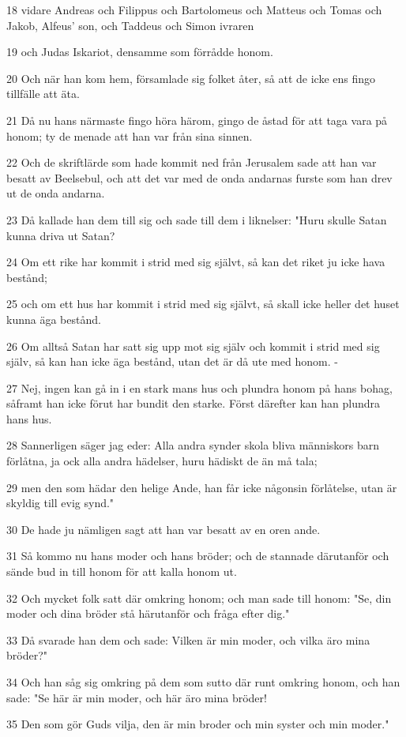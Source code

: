 \par 18 vidare Andreas och Filippus och Bartolomeus och Matteus och Tomas och Jakob, Alfeus' son, och Taddeus och Simon ivraren
\par 19 och Judas Iskariot, densamme som förrådde honom.
\par 20 Och när han kom hem, församlade sig folket åter, så att de icke ens fingo tillfälle att äta.
\par 21 Då nu hans närmaste fingo höra härom, gingo de åstad för att taga vara på honom; ty de menade att han var från sina sinnen.
\par 22 Och de skriftlärde som hade kommit ned från Jerusalem sade att han var besatt av Beelsebul, och att det var med de onda andarnas furste som han drev ut de onda andarna.
\par 23 Då kallade han dem till sig och sade till dem i liknelser: "Huru skulle Satan kunna driva ut Satan?
\par 24 Om ett rike har kommit i strid med sig självt, så kan det riket ju icke hava bestånd;
\par 25 och om ett hus har kommit i strid med sig självt, så skall icke heller det huset kunna äga bestånd.
\par 26 Om alltså Satan har satt sig upp mot sig själv och kommit i strid med sig själv, så kan han icke äga bestånd, utan det är då ute med honom. -
\par 27 Nej, ingen kan gå in i en stark mans hus och plundra honom på hans bohag, såframt han icke förut har bundit den starke. Först därefter kan han plundra hans hus.
\par 28 Sannerligen säger jag eder: Alla andra synder skola bliva människors barn förlåtna, ja ock alla andra hädelser, huru hädiskt de än må tala;
\par 29 men den som hädar den helige Ande, han får icke någonsin förlåtelse, utan är skyldig till evig synd."
\par 30 De hade ju nämligen sagt att han var besatt av en oren ande.
\par 31 Så kommo nu hans moder och hans bröder; och de stannade därutanför och sände bud in till honom för att kalla honom ut.
\par 32 Och mycket folk satt där omkring honom; och man sade till honom: "Se, din moder och dina bröder stå härutanför och fråga efter dig."
\par 33 Då svarade han dem och sade: Vilken är min moder, och vilka äro mina bröder?"
\par 34 Och han såg sig omkring på dem som sutto där runt omkring honom, och han sade: "Se här är min moder, och här äro mina bröder!
\par 35 Den som gör Guds vilja, den är min broder och min syster och min moder."

